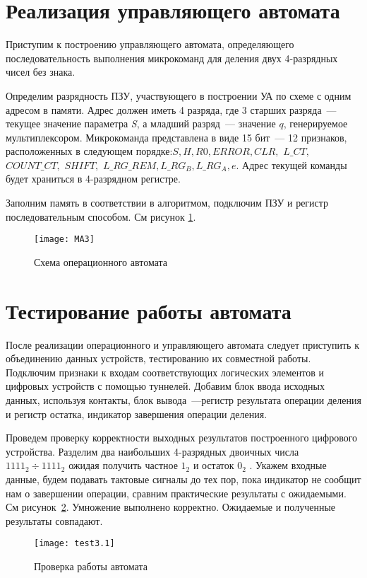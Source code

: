 \documentclass[a4paper,14pt]{extarticle}
\begin{document}
\section {Реализация управляющего автомата}
Приступим к построению управляющего автомата, определяющего последовательность выполнения микрокоманд для деления двух 4-разрядных чисел без знака.

Определим разрядность ПЗУ, участвующего в построении УА по схеме с одним адресом в памяти. Адрес должен иметь 4 разряда, где 3 старших разряда~--- текущее значение параметра \textit{S}, а младший разряд~--- значение $q$, генерируемое мультиплексором. Микрокоманда представлена в виде 15 бит~--- 12 признаков, расположенных в следующем порядке:\hspace{0ex}$S, H, R0, ERROR, CLR,$ $L\_CT,$ $COUNT\_CT,$ $SHIFT,$ $L\_RG\_REM, L\_RG_B, L\_RG_A, e$. Адрес текущей команды будет храниться в 4-разрядном регистре.


Заполним память в соответствии в алгоритмом, подключим ПЗУ и регистр последовательным способом. См рисунок \ref{img:ma}.
\begin{figure}[h!]
	\centering
	\texttt{[image: MA3]}
	\caption {Схема операционного автомата}
	\label{img:ma}
\end{figure}

\section{Тестирование работы автомата}
После реализации операционного и управляющего автомата следует приступить к объединению данных устройств, тестированию их совместной работы. Подключим признаки к входам соответствующих логических элементов и цифровых устройств с помощью туннелей. Добавим блок ввода исходных данных, используя контакты, блок вывода~---регистр результата операции деления и регистр остатка, индикатор завершения операции деления.

Проведем проверку корректности выходных результатов построенного цифрового устройства. Разделим два наибольших 4-разрядных двоичных числа $1111_2 \div 1111_2$ ожидая получить частное $1_2$ и остаток $0_2$ . Укажем входные данные, будем подавать тактовые сигналы до тех пор, пока индикатор не сообщит нам о завершении операции, сравним практические результаты с ожидаемыми. См рисунок~\ref{img:test}. Умножение выполнено корректно. Ожидаемые и полученные результаты совпадают.
\begin{figure}[h!]
	\centering
	\texttt{[image: test3.1]}
	\caption {Проверка работы автомата}
	\label{img:test}
\end{figure}
\end{document}
